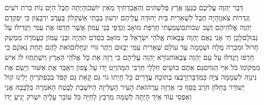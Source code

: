 \documentclass[../main/main.tex]{subfiles}
\begin{document}
\begin{multicols*}{\ncols}
דְּבַר יַהְוֶה עֲלֵיכֶם כְּנַעַן אֶרֶץ פְּלִשְׁתִּים וְהַאֲבַדְתִּיךְ מֵאֵין יוֹשֵׁב\PreVerseSpace{}וְהָיְתָה חֶבֶל הַיָּם נְוֺת כְּרֹת רֹעִים וְגִדְרוֹת צֹאן\PreVerseSpace{}וְהָיָה חֶבֶל לִשְׁאֵרִית בֵּית יְהוּדָה עֲלֵיהֶם יִרְעוּן בְּבָתֵּי אַשְׁקְלוֹן בָּעֶרֶב יִרְבָּצוּן כִּי יִפְקְדֵם יַהְוֶה אֱלֹהֵיהֶם וְשָׁב שבותם\PreVerseSpace{}שָׁמַעְתִּי חֶרְפַּת מוֹאָב וְגִדֻּפֵי בְּנֵי עַמּוֹן אֲשֶׁר חֵרְפוּ אֶת עַמִּי וַיַּגְדִּילוּ עַל גְּבוּלָם\PreVerseSpace{}לָכֵן חַי אָנִי נְאֻם יַהְוֶה צְבָאוֹת אֱלֹהֵי יִשְׂרָאֵל כִּי מוֹאָב כִּסְדֹם תִּהְיֶה וּבְנֵי עַמּוֹן כַּעֲמֹרָה מִמְשַׁק חָרוּל וּמִכְרֵה מֶלַח וּשְׁמָמָה עַד עוֹלָם שְׁאֵרִית עַמִּי יְבָזּוּם וְיֶתֶר גּוֹיִי\SubEnd{} יִנְחָלוּם\PreVerseSpace{}זֹאת לָהֶם תַּחַת גְּאוֹנָם כִּי חֵרְפוּ וַיַּגְדִּלוּ עַל עַם יַהְוֶה צְבָאוֹת\PreVerseSpace{}נוֹרָא יַהְוֶה עֲלֵיהֶם כִּי רָזָה אֵת כָּל אֱלֹהֵי הָאָרֶץ וְיִשְׁתַּחֲווּ לוֹ אִישׁ מִמְּקוֹמוֹ כֹּל אִיֵּי הַגּוֹיִם\PreVerseSpace{}גַּם אַתֶּם כּוּשִׁים חַלְלֵי חַרְבִּי הֵמָּה\PreVerseSpace{}וְיֵט יָדוֹ עַל צָפוֹן וִיאַבֵּד אֶת אַשּׁוּר וְיָשֵׂם אֶת נִינְוֵה לִשְׁמָמָה צִיָּה כַּמִּדְבָּר\PreVerseSpace{}וְרָבְצוּ בְתוֹכָהּ עֲדָרִים כָּל חַיְתוֹ גוֹי גַּם קָאַת גַּם קִפֹּד בְּכַפְתֹּרֶיהָ יָלִינוּ קוֹל יְשׁוֹרֵר בַּחַלּוֹן חֹרֶב בַּסַּף כִּי אַרְזָה עֵרָה\PreVerseSpace{}זֹאת הָעִיר הָעַלִּיזָה הַיּוֹשֶׁבֶת לָבֶטַח הָאֹמְרָה בִּלְבָבָהּ אֲנִי וְאַפְסִי עוֹד אֵיךְ הָיְתָה לְשַׁמָּה מַרְבֵּץ לַחַיָּה כֹּל עוֹבֵר עָלֶיהָ יִשְׁרֹק יָנִיעַ יָדוֹ\OpenSection{}\par

\end{multicols*}
\end{document}
